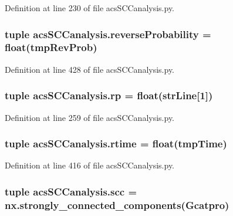 Definition at line 230 of file acs\-S\-C\-Canalysis.\-py.

\hypertarget{a00128_aa7db2dba66810044f9c5238eccc995b7}{
\subsubsection[{reverse\-Probability}]{\setlength{\rightskip}{0pt plus 5cm}tuple acs\-S\-C\-Canalysis.\-reverse\-Probability = float(tmp\-Rev\-Prob)}}\label{a00128_aa7db2dba66810044f9c5238eccc995b7}


Definition at line 428 of file acs\-S\-C\-Canalysis.\-py.

\hypertarget{a00128_a98150f532e09ebae495212500d2f1799}{
\subsubsection[{rp}]{\setlength{\rightskip}{0pt plus 5cm}tuple acs\-S\-C\-Canalysis.\-rp = float({\bf str\-Line}\mbox{[}1\mbox{]})}}\label{a00128_a98150f532e09ebae495212500d2f1799}


Definition at line 259 of file acs\-S\-C\-Canalysis.\-py.

\hypertarget{a00128_a162a08b0497058c76e7e885c03a01336}{
\subsubsection[{rtime}]{\setlength{\rightskip}{0pt plus 5cm}tuple acs\-S\-C\-Canalysis.\-rtime = float(tmp\-Time)}}\label{a00128_a162a08b0497058c76e7e885c03a01336}


Definition at line 416 of file acs\-S\-C\-Canalysis.\-py.

\hypertarget{a00128_a2094b7f0917a16a948a2d1c4d700e84c}{
\subsubsection[{scc}]{\setlength{\rightskip}{0pt plus 5cm}tuple acs\-S\-C\-Canalysis.\-scc = nx.\-strongly\-\_\-connected\-\_\-components({\bf Gcatpro})}}\label{a00128_a2094b7f0917a16a948a2d1c4d700e84c}


